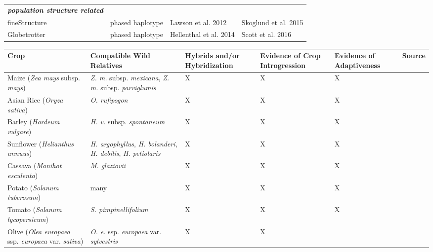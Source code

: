 \documentclass[11pt]{article}
\begin{document}
\begin{table}
\begin{center}
\begin{tabular}{llll}

\rowcolor{white}
{\emph{\bf population structure related}} &   &   &   \\
\rowcolor{white}
fineStructure &	phased haplotype &	Lawson et al. 2012	& Skoglund et al. 2015 \\
\rowcolor{white}
Globetrotter &	phased haplotype &	Hellenthal et al. 2014 & Scott et al. 2016 \\
\end{tabular}
\end{center}
\end{table} 





\begin{table}
\centering
\begin{adjustbox}{width=1\textwidth}
\small
\label{my-label}
\begin{tabular}{|p{5cm}|p{5cm}|p{2.6cm}|p{2.6cm}|p{2.6cm}|l|}
\hline
Crop & Compatible Wild Relatives & Hybrids and/or Hybridization & Evidence of Crop Introgression & Evidence of Adaptiveness & Source \\ \hline \hline
Maize (\emph{Zea mays} subsp. \emph{mays}) & \emph{Z. m.} subsp. \emph{mexicana}, \emph{Z. m. } subsp. \emph{parviglumis} & X & X & X & \cite{hufford2013genomic} \\ 
\hline 
Asian Rice (\emph{Oryza sativa}) & \emph{O. rufipogon} & X & X & X & \cite{Huang2012} \\ 
\hline
Barley (\emph{Hordeum vulgare}) & \emph{H. v.} subsp. \emph{spontaneum} & X & X & X & \cite{Poets2015} \\ \hline
Sunflower (\emph{Helianthus annuus}) & \emph{H. argophyllus}, \emph{H. bolanderi}, \emph{H. debilis}, \emph{H. petiolaris} & X & X & X & \cite{rieseberg2007hybridization}\\ 
\hline
Cassava (\emph{Manihot esculenta}) & \emph{M. glaziovii} & X & X & X & \cite{bredeson2016sequencing} \\ 
\hline
Potato (\emph{Solanum tuberosum}) & many & X & X & X & \cite{johns1986ongoing} \\
\hline
Tomato (\emph{Solanum lycopersicum}) & \emph{S. pimpinellifolium} & X & X & X & \cite{rick1958role} \\
\hline
Olive (\emph{Olea europaea} ssp. \emph{europaea} var. \emph{sativa}) & \emph{O. e.} ssp. \emph{europaea} var. \emph{sylvestris} & X & X & & \cite{diez2015olive} \\ 

\end{tabular}
\end{adjustbox}
\end{table}
\end{document}
